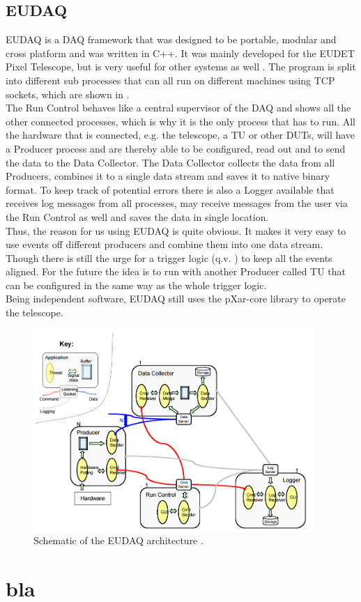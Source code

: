 \documentclass[british,11pt,a4paper]{memoir}
\begin{document}
\section{EUDAQ}
EUDAQ is a \ac{DAQ} framework that was designed to be portable, modular and cross platform and was written in C++. It was mainly developed for the EUDET Pixel Telescope, but is very useful for other systems as well \cite{eudaq}. The program is split into different sub processes that can all run on different machines using \ac{TCP} sockets, which are shown in .\\
The Run Control behaves like a central supervisor of the \ac{DAQ} and shows all the other connected processes, which is why it is the only process that has to run. All the hardware that is connected, e.g. the telescope, a \ac{TU} or other \ac{DUT}s, will have a Producer process and are thereby able to be configured, read out and to send the data to the Data Collector. The Data Collector collects the data from all Producers, combines it to a single data stream and saves it to native binary format. To keep track of potential errors there is also a Logger available that receives log messages from all processes, may receive messages from the user via the Run Control as well and saves the data in single location.\\
Thus, the reason for us using EUDAQ is quite obvious. It makes it very easy to use events off different producers and combine them into one data stream. Though there is still the urge for a trigger logic (q.v. ) to keep all the events aligned. For the future the idea is to run with another Producer called \ac{TU} that can be configured in the same way as the whole trigger logic.\\
Being independent software, EUDAQ still uses the pXar-core library to operate the telescope.
\begin{figure}[ht]
	\includegraphics[width=0.95\textwidth]{eudaq}
	\caption{Schematic of the EUDAQ architecture \cite{eudaq}.}
	\label{p16}
\end{figure}

\chapter{bla}



\end{document}
